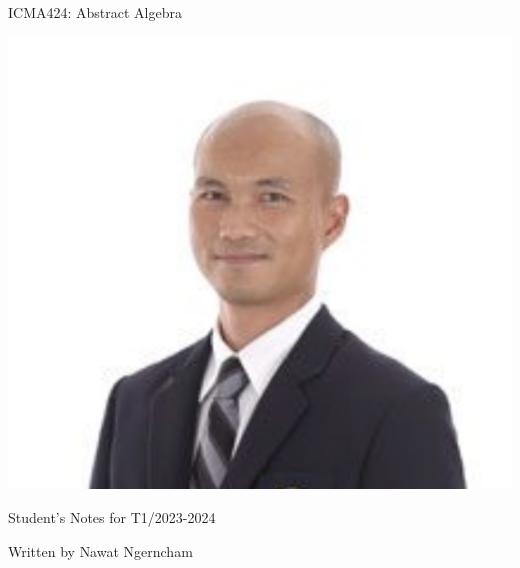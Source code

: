 \thispagestyle{empty}

\begin{center}
\vspace{5cm}

\Huge{ICMA424: Abstract Algebra}

\vspace{5em}
\includegraphics{images/chadchawan.png}
\vspace{5em}

\Large Student's Notes for {T1/2023-2024}

\Large Written by {Nawat Ngerncham}
\end{center}
